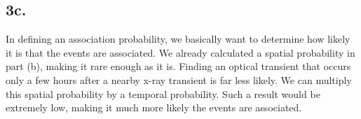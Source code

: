 \documentclass{article}
\begin{document}
\subsection*{3c.}
In defining an association probability, we basically want to determine how likely it is that the events are associated. We already calculated a spatial probability in part (b), making it rare enough as it is. Finding an optical transient that occurs only a few hours after a nearby x-ray transient is far less likely. We can multiply this spatial probability by a temporal probability. Such a result would be extremely low, making it much more likely the events are associated.

\printbibliography[heading=bibnumbered]
\end{document}
